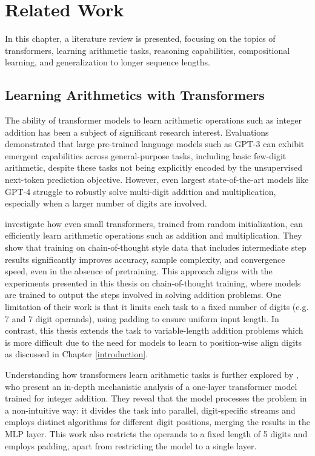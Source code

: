 \chapter{Related Work}\label{related_work}

In this chapter, a literature review is presented, focusing on the topics of transformers, learning arithmetic tasks, reasoning capabilities, compositional learning, and generalization to longer sequence lengths.


\section{Learning Arithmetics with Transformers}\label{sec:sota_arithmetic_tasks}

The ability of transformer models \parencite{vaswani_attention_2017} to learn arithmetic operations such as integer addition has been a subject of significant research interest. Evaluations demonstrated that large pre-trained language models such as GPT-3 \parencite{brown_language_2020} can exhibit emergent capabilities across general-purpose tasks, including basic few-digit arithmetic, despite these tasks not being explicitly encoded by the unsupervised next-token prediction objective. However, even largest state-of-the-art models like GPT-4 \parencite{achiam_gpt-4_2023} struggle to robustly solve multi-digit addition and multiplication, especially when a larger number of digits are involved.

\cite{lee_teaching_2023} investigate how even small transformers, trained from random initialization, can efficiently learn arithmetic operations such as addition and multiplication. They show that training on chain-of-thought style data that includes intermediate step results significantly improves accuracy, sample complexity, and convergence speed, even in the absence of pretraining. This approach aligns with the experiments presented in this thesis on chain-of-thought training, where models are trained to output the steps involved in solving addition problems. One limitation of their work is that it limits each task to a fixed number of digits (e.g. 7 and 7 digit operands), using padding to ensure uniform input length. In contrast, this thesis extends the task to variable-length addition problems which is more difficult due to the need for models to learn to position-wise align digits as discussed in Chapter \ref{introduction}.

Understanding how transformers learn arithmetic tasks is further explored by \cite{quirke_understanding_2023}, who present an in-depth mechanistic analysis of a one-layer transformer model trained for integer addition. They reveal that the model processes the problem in a non-intuitive way: it divides the task into parallel, digit-specific streams and employs distinct algorithms for different digit positions, merging the results in the MLP layer. This work also restricts the operands to a fixed length of 5 digits and employs padding, apart from restricting the model to a single layer.

